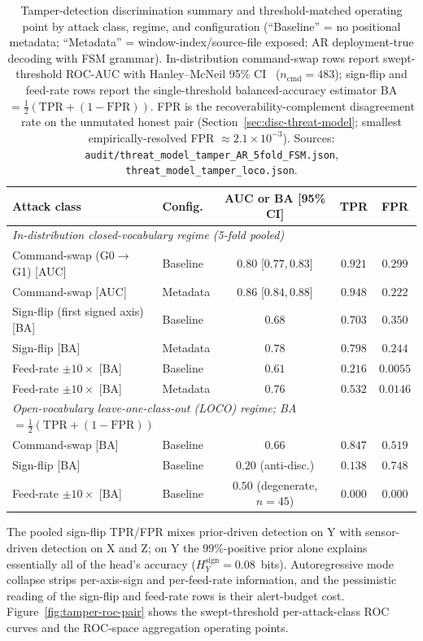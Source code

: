 \documentclass[sensors,article,submit,moreauthors,pdftex]{Definitions/mdpi}
\begin{document}
\begin{table}[!htbp]
\centering
\caption{Tamper-detection discrimination summary and threshold-matched operating point by attack class, regime, and configuration (``Baseline'' = no positional metadata; ``Metadata'' = window-index/source-file exposed; AR deployment-true decoding with FSM grammar). In-distribution command-swap rows report swept-threshold ROC-AUC with Hanley--McNeil 95\% CI~\cite{hanley1982meaning} ($n_{\text{cmd}}\!=\!483$); sign-flip and feed-rate rows report the single-threshold balanced-accuracy estimator BA$=\!\tfrac{1}{2}(\mathrm{TPR}+(1-\mathrm{FPR}))$. FPR is the recoverability-complement disagreement rate on the unmutated honest pair (Section~\ref{sec:disc-threat-model}; smallest empirically-resolved FPR $\approx\!2.1\!\times\!10^{-3}$). Sources: \texttt{audit/threat\_model\_tamper\_AR\_5fold\_FSM.json}, \texttt{threat\_model\_tamper\_loco.json}.}
\label{tab:tamper_auc}
\footnotesize
\setlength{\tabcolsep}{4pt}
\begin{tabular}{l l c c c}
\toprule
\textbf{Attack class} & \textbf{Config.} & \textbf{AUC or BA [95\% CI]} & \textbf{TPR} & \textbf{FPR} \\
\midrule
\multicolumn{5}{l}{\emph{In-distribution closed-vocabulary regime (5-fold pooled)}} \\
Command-swap (G0$\to$G1) [AUC]   & Baseline & $0.80$ \tiny{[$0.77, 0.83$]} & $0.921$ & $0.299$ \\
Command-swap [AUC]               & Metadata  & $0.86$ \tiny{[$0.84, 0.88$]} & $0.948$ & $0.222$ \\
Sign-flip (first signed axis) [BA] & Baseline & $0.68$ & $0.703$ & $0.350$ \\
Sign-flip [BA]                   & Metadata  & $0.78$ & $0.798$ & $0.244$ \\
Feed-rate $\pm 10\times$ [BA]    & Baseline & $0.61$ & $0.216$ & $0.0055$ \\
Feed-rate $\pm 10\times$ [BA]    & Metadata  & $0.76$ & $0.532$ & $0.0146$ \\
\midrule
\multicolumn{5}{l}{\emph{Open-vocabulary leave-one-class-out (LOCO) regime; BA$\!=\!\tfrac{1}{2}(\mathrm{TPR}+(1-\mathrm{FPR}))$}} \\
Command-swap [BA]                & Baseline & $0.66$ & $0.847$ & $0.519$ \\
Sign-flip [BA]                   & Baseline & $0.20$ \tiny{(anti-disc.)} & $0.138$ & $0.748$ \\
Feed-rate $\pm 10\times$ [BA]    & Baseline & $0.50$ \tiny{(degenerate, $n\!=\!45$)} & $0.000$ & $0.000$ \\
\bottomrule
\end{tabular}
\end{table}
The pooled sign-flip TPR/FPR mixes prior-driven detection on Y with sensor-driven detection on X and Z; on Y the $99\%$-positive prior alone explains essentially all of the head's accuracy ($H_{Y}^{\text{sign}}=0.08$~bits). Autoregressive mode collapse strips per-axis-sign and per-feed-rate information, and the pessimistic reading of the sign-flip and feed-rate rows is their alert-budget cost. Figure~\ref{fig:tamper-roc-pair} shows the swept-threshold per-attack-class ROC curves and the ROC-space aggregation operating points.
\end{document}
